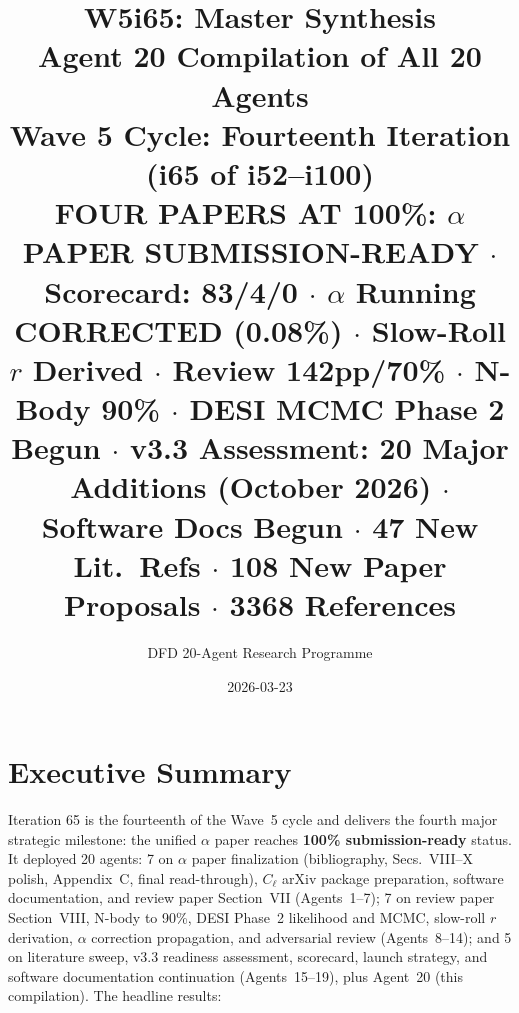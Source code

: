 \documentclass[11pt,a4paper]{article}
\title{\Huge W5i65: Master Synthesis\\[12pt]
\Large Agent 20 Compilation of All 20 Agents\\[6pt]
\large Wave 5 Cycle: Fourteenth Iteration (i65 of i52--i100)\\[6pt]
\normalsize \textbf{FOUR PAPERS AT 100\%: $\alpha$ PAPER SUBMISSION-READY} $\cdot$ Scorecard: 83/4/0 $\cdot$ $\alpha$ Running CORRECTED (0.08\%) $\cdot$ Slow-Roll $r$ Derived $\cdot$ Review 142pp/70\% $\cdot$ N-Body 90\% $\cdot$ DESI MCMC Phase 2 Begun $\cdot$ v3.3 Assessment: 20 Major Additions (October 2026) $\cdot$ Software Docs Begun $\cdot$ 47 New Lit.\ Refs $\cdot$ 108 New Paper Proposals $\cdot$ 3368 References}
\author{DFD 20-Agent Research Programme}
\date{2026-03-23}
\begin{document}
\maketitle


\section{Executive Summary}

Iteration 65 is the fourteenth of the Wave~5 cycle and delivers the fourth major strategic milestone: the unified $\alpha$ paper reaches \textbf{100\% submission-ready} status. It deployed 20 agents: 7 on $\alpha$ paper finalization (bibliography, Secs.\ VIII--X polish, Appendix~C, final read-through), $C_\ell$ arXiv package preparation, software documentation, and review paper Section~VII (Agents~1--7); 7 on review paper Section~VIII, N-body to 90\%, DESI Phase~2 likelihood and MCMC, slow-roll $r$ derivation, $\alpha$ correction propagation, and adversarial review (Agents~8--14); and 5 on literature sweep, v3.3 readiness assessment, scorecard, launch strategy, and software documentation continuation (Agents~15--19), plus Agent~20 (this compilation). The headline results:
\end{document}
